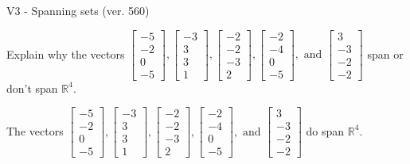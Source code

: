 \begin{exercise}
  \begin{exerciseTitle}V3 - Spanning sets (ver. 560)\end{exerciseTitle}
  \begin{exerciseStatement}
    Explain why the vectors \(\left[\begin{array}{r}
-5 \\
-2 \\
0 \\
-5
\end{array}\right] , \left[\begin{array}{r}
-3 \\
3 \\
3 \\
1
\end{array}\right] , \left[\begin{array}{r}
-2 \\
-2 \\
-3 \\
2
\end{array}\right] , \left[\begin{array}{r}
-2 \\
-4 \\
0 \\
-5
\end{array}\right] , \text{ and } \left[\begin{array}{r}
3 \\
-3 \\
-2 \\
-2
\end{array}\right]\) span or don't span \(\mathbb{R}^4\). 
	


  \end{exerciseStatement}
  \begin{exerciseAnswer}
   The vectors \(\left[\begin{array}{r}
-5 \\
-2 \\
0 \\
-5
\end{array}\right] , \left[\begin{array}{r}
-3 \\
3 \\
3 \\
1
\end{array}\right] , \left[\begin{array}{r}
-2 \\
-2 \\
-3 \\
2
\end{array}\right] , \left[\begin{array}{r}
-2 \\
-4 \\
0 \\
-5
\end{array}\right] , \text{ and } \left[\begin{array}{r}
3 \\
-3 \\
-2 \\
-2
\end{array}\right]\) 
  	 do  
	span \(\mathbb{R}^4\).
  



\end{exerciseAnswer}
\end{exercise}
